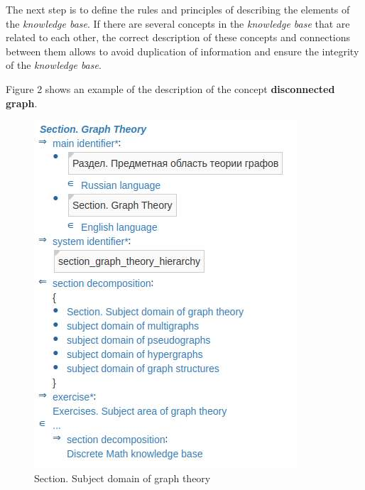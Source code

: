 \documentclass[twocolumn]{scndocument}
\begin{document}
The next step is to define the rules and principles of describing the elements of the \textit{knowledge base}. If there are several concepts in the \textit{knowledge base} that are related to each other, the correct description of these concepts and connections between them allows to avoid duplication of information and ensure the integrity of the \textit{knowledge base}.

Figure 2 shows an example of the description of the concept \textbf{disconnected graph}.

\newpage

\captionsetup{labelsep=period} 

\begin{figure}[H]
    \centering
    \includegraphics[width=0.9\linewidth]{1.jpg}
    \caption{Section. Subject domain of graph theory}
\end{figure}
\end{document}
